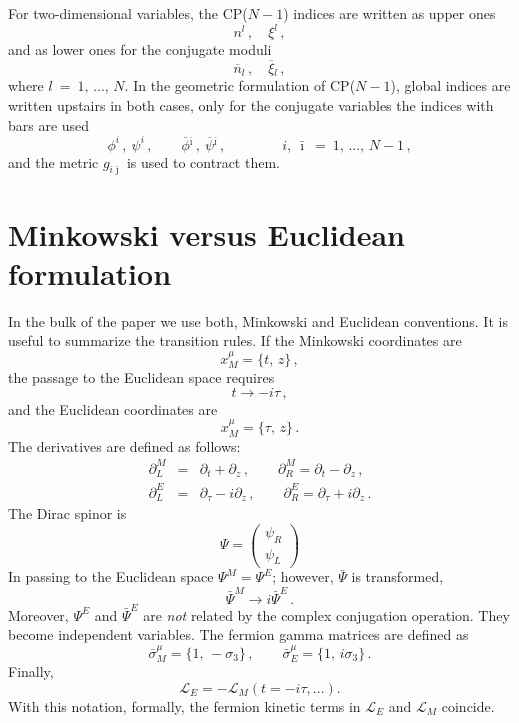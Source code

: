 \documentclass[epsfig,12pt]{article}
\def\beq{\begin{equation}}
\def\eeq{\end{equation}}
\def\beqn{\begin{eqnarray}}
\def\eeqn{\end{eqnarray}}
\newcommand{\cell}{{\mathcal L}}
\newcommand{\pt}{\partial}
\renewcommand{\theequation}{\thesection.\arabic{equation}}
\def\beqn{\begin{eqnarray}}
\def\eeqn{\end{eqnarray}}
\def\beq{\begin{equation}}
\def\eeq{\end{equation}}
\renewcommand{\theequation}{\thesection.\arabic{equation}}
\newcommand{\ov}{\overline}
\newcommand{\bi}{{\bar \imath}}
\newcommand{\bj}{{\bar \jmath}}
\begin{document}
{For two-dimensional variables, the CP($N-1$) indices are written as upper ones 
\[
	n^l\,, \quad \xi^l\,,
\]
and as lower ones for the conjugate moduli
\[
	\ov{n}{}_l\,, \quad \ov{\xi}{}_l\,, 
\]
where $ l~=~1,\, ...,\, N $.
In the geometric formulation of CP($N-1$), global indices are written upstairs in both cases, only
for the conjugate variables the indices with bars are used 
\[
	\phi^i\,,\ \psi^i\,, \qquad \ov{\phi}{}^\bi\,,\ \ov{\psi}{}^\bi\,, 
	\qquad\qquad i,\ \bi ~=~ 1,\,...,\,N-1\,,
\]
and the metric $ g_{i\bj} $ is used to contract them.


\section{Minkowski versus Euclidean formulation}
 \renewcommand{\theequation}{\Alph{section}.\arabic{equation}}
\setcounter{equation}{0}
 
 \renewcommand{\thesubsection}{\Alph{section}.\arabic{subsection}}
\setcounter{subsection}{0}
\label{app:mink}

In the bulk of the paper we use both, Minkowski and Euclidean conventions.
It is useful to summarize the transition rules.
If the Minkowski coordinates are
\beq
x^\mu_M =\{t,\,z\}\,,
\label{appeone}
\eeq
the passage to the Euclidean space requires
\beq
t \to - i\tau\,,
\label{appe2}
\eeq
and the Euclidean coordinates are
\beq
x^\mu_M =\{\tau,\,z\}\,.
\label{appe3}
\eeq
The derivatives are defined as follows:
\beqn
\pt_L^M &=& \pt_t+\pt_z\,,\qquad \pt_R^M = \pt_t- \pt_z\,,
\nonumber\\[2mm]
\pt_L^E &=& \pt_\tau - i \pt_z\,,\qquad \pt_R^E = \pt_\tau + i \pt_z\,.
\label{appe4}
\eeqn
The Dirac spinor is
\beq
\Psi =\left(
\begin{array}{c}
\psi_R\\[1mm]
\psi_L
\end{array}
\right)
\label{appe5}
\eeq
In passing to the Euclidean space $\Psi^M = \Psi^E$;
however, $\bar\Psi$ is transformed,
\beq
\bar\Psi^M \to i \bar \Psi^E\,.
\label{appe6}
\eeq
Moreover, $\Psi^E$ and $\bar \Psi^E$ are {\em not} related by the complex conjugation operation.
They become independent variables. The fermion gamma matrices are defined as
\beq
\bar\sigma^\mu_M =\{1,\,-\sigma_3\}\,,\qquad \bar\sigma^\mu_E =\{1,\, i\sigma_3\}\,.
\label{appe7}
\eeq
Finally, 
\beq
\cell_E =- \cell_M (t=-i\tau , ...).
\eeq
With this notation, formally, the fermion kinetic terms in $\cell_E $ and $\cell_M $
coincide.

}
\end{document}
